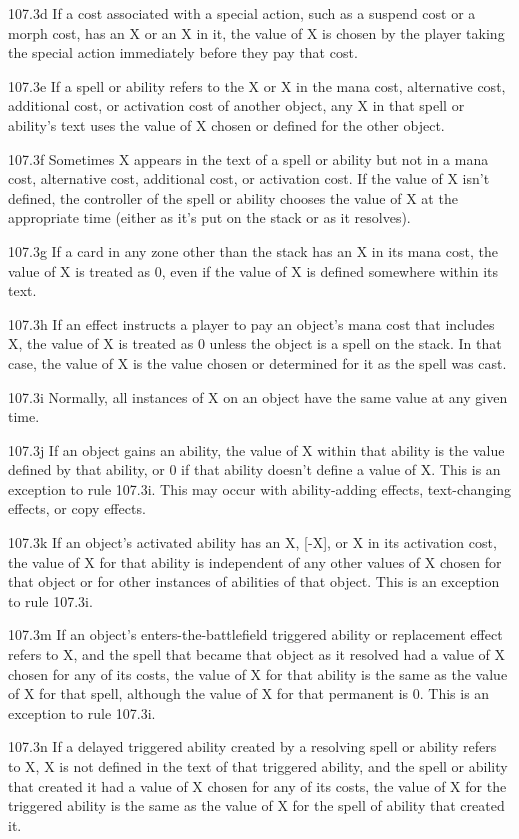 107.3d If a cost associated with a special action, such as a suspend cost or a morph cost, has an {X} or an X in it, the value of X is chosen by the player taking the special action immediately before they pay that cost.

107.3e If a spell or ability refers to the {X} or X in the mana cost, alternative cost, additional cost, or activation cost of another object, any X in that spell or ability’s text uses the value of X chosen or defined for the other object.

107.3f Sometimes X appears in the text of a spell or ability but not in a mana cost, alternative cost, additional cost, or activation cost. If the value of X isn’t defined, the controller of the spell or ability chooses the value of X at the appropriate time (either as it’s put on the stack or as it resolves).

107.3g If a card in any zone other than the stack has an {X} in its mana cost, the value of {X} is treated as 0, even if the value of X is defined somewhere within its text.

107.3h If an effect instructs a player to pay an object’s mana cost that includes {X}, the value of X is treated as 0 unless the object is a spell on the stack. In that case, the value of X is the value chosen or determined for it as the spell was cast.

107.3i Normally, all instances of X on an object have the same value at any given time.

107.3j If an object gains an ability, the value of X within that ability is the value defined by that ability, or 0 if that ability doesn’t define a value of X. This is an exception to rule 107.3i. This may occur with ability-adding effects, text-changing effects, or copy effects.

107.3k If an object’s activated ability has an {X}, [-X], or X in its activation cost, the value of X for that ability is independent of any other values of X chosen for that object or for other instances of abilities of that object. This is an exception to rule 107.3i.

107.3m If an object’s enters-the-battlefield triggered ability or replacement effect refers to X, and the spell that became that object as it resolved had a value of X chosen for any of its costs, the value of X for that ability is the same as the value of X for that spell, although the value of X for that permanent is 0. This is an exception to rule 107.3i.

107.3n If a delayed triggered ability created by a resolving spell or ability refers to X, X is not defined in the text of that triggered ability, and the spell or ability that created it had a value of X chosen for any of its costs, the value of X for the triggered ability is the same as the value of X for the spell of ability that created it.


